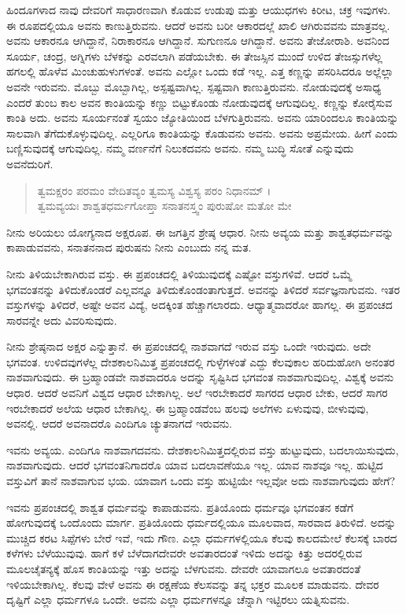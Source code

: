 ಹಿಂದೂಗಳಾದ ನಾವು ದೇವರಿಗೆ ಸಾಧಾರಣವಾಗಿ ಕೊಡುವ ಉಡುಪು ಮತ್ತು ಆಯುಧಗಳು ಕಿರೀಟ, ಚಕ್ರ ಇವುಗಳು. ಈ ರೂಪದಲ್ಲಿಯೂ ಅವನು ಕಾಣುತ್ತಿರುವನು. ಆದರೆ ಅವನು ಬರೀ ಆಕಾರದಲ್ಲೆ ಖಾಲಿ ಆಗಿರುವವನು ಮಾತ್ರವಲ್ಲ. ಅವನು ಆಕಾರನೂ ಆಗಿದ್ದಾನೆ, ನಿರಾಕಾರನೂ ಆಗಿದ್ದಾನೆ. ಸುಗುಣನೂ ಆಗಿದ್ದಾನೆ. ಅವನು ತೇಜೋರಾಶಿ. ಅವನಿಂದ ಸೂರ್ಯ, ಚಂದ್ರ, ಅಗ್ನಿಗಳು ಬೆಳಕನ್ನು ಎರವಲಾಗಿ ಪಡೆಯಬೇಕು. ಈ ತೇಜಸ್ಸಿನ ಮುಂದೆ ಉಳಿದ ತೇಜಸ್ಸುಗಳೆಲ್ಲ ಹಗಲಲ್ಲಿ ಹೊಳೆವ ಮಿಂಚುಹುಳುಗಳಂತೆ. ಅವನು ಎಲ್ಲೋ ಒಂದು ಕಡೆ ಇಲ್ಲ. ಎತ್ತ ಕಣ್ಣನ್ನು ಪಸರಿಸಿದರೂ ಅಲ್ಲೆಲ್ಲಾ ಅವನೇ ಇರುವನು. ಮೊಬ್ಬು ಮೊಬ್ಬಾಗಿಲ್ಲ, ಅಸ್ಪಷ್ಟವಾಗಿಲ್ಲ. ಸ್ಪಷ್ಟವಾಗಿ ಕಾಣುತ್ತಿರುವನು. ನೋಡುವುದಕ್ಕೆ ಅಸಾಧ್ಯ ಎಂದರೆ ತುಂಬ ಕಾಲ ಅವನ ಕಾಂತಿಯನ್ನು ಕಣ್ಣು ಬಿಟ್ಟುಕೊಂಡು ನೋಡುವುದಕ್ಕೆ ಆಗುವುದಿಲ್ಲ. ಕಣ್ಣನ್ನು ಕೋರೈಸುವ ಕಾಂತಿ ಅದು. ಅವನು ಸೂರ್ಯನಂತೆ ಸ್ವಯಂ ಜ್ಯೋತಿಯಿಂದ ಬೆಳಗುತ್ತಿರುವನು. ಅವನು ಯಾರಿಂದಲೂ ಕಾಂತಿಯನ್ನು ಸಾಲವಾಗಿ ತೆಗೆದುಕೊಳ್ಳುವುದಿಲ್ಲ. ಎಲ್ಲರಿಗೂ ಕಾಂತಿಯನ್ನು ಕೊಡುವನು ಅವನು. ಅವನು ಅಪ್ರಮೇಯ. ಹೀಗೆ ಎಂದು ಬಣ್ಣಿಸುವುದಕ್ಕೆ ಆಗುವುದಿಲ್ಲ. ನಮ್ಮ ವರ್ಣನೆಗೆ ನಿಲುಕದವನು ಅವನು. ನಮ್ಮ ಬುದ್ಧಿ ಸೋತೆ ಎನ್ನುವುದು ಅವನೆದುರಿಗೆ.

\begin{verse}
ತ್ವಮಕ್ಷರಂ ಪರಮಂ ವೇದಿತವ್ಯಂ ತ್ವಮಸ್ಯ ವಿಶ್ವಸ್ಯ ಪರಂ ನಿಧಾನಮ್ ।\\ತ್ವಮವ್ಯಯಃ ಶಾಶ್ವತಧರ್ಮಗೋಪ್ತಾ ಸನಾತನಸ್ತ್ವಂ ಪುರುಷೋ ಮತೋ ಮೇ 
\end{verse}

{\small ನೀನು ಅರಿಯಲು ಯೋಗ್ಯನಾದ ಅಕ್ಷರೂಪ. ಈ ಜಗತ್ತಿನ ಶ್ರೇಷ್ಠ ಆಧಾರ. ನೀನು ಅವ್ಯಯ ಮತ್ತು ಶಾಶ್ವತಧರ್ಮವನ್ನು ಕಾಪಾಡುವವನು, ಸನಾತನನಾದ ಪುರುಷನು ನೀನು ಎಂಬುದು ನನ್ನ ಮತ.}

ನೀನು ತಿಳಿಯಬೇಕಾಗಿರುವ ವಸ್ತು. ಈ ಪ್ರಪಂಚದಲ್ಲಿ ತಿಳಿಯುವುದಕ್ಕೆ ಎಷ್ಟೋ ವಸ್ತುಗಳಿವೆ. ಆದರೆ ಒಮ್ಮೆ ಭಗವಂತನನ್ನು ತಿಳಿದುಕೊಂಡರೆ ಎಲ್ಲವನ್ನೂ ತಿಳಿದುಕೊಂಡಂತಾಗುತ್ತದೆ. ಅವನನ್ನು ತಿಳಿದರೆ ಸರ್ವಜ್ಞನಾಗುವನು. ಇತರ ವಸ್ತುಗಳನ್ನು ತಿಳಿದರೆ, ಅಷ್ಟೇ ಅವನ ವಿದ್ಯೆ, ಅದಕ್ಕಿಂತ ಹೆಚ್ಚಾಗಲಾರದು. ಆಧ್ಯಾತ್ಮವಾದರೋ ಹಾಗಲ್ಲ. ಈ ಪ್ರಪಂಚದ ಸಾರವನ್ನೇ ಅದು ವಿವರಿಸುವುದು.

ನೀನು ಶ್ರೇಷ್ಠನಾದ ಅಕ್ಷರ ಎನ್ನುತ್ತಾನೆ. ಈ ಪ್ರಪಂಚದಲ್ಲಿ ನಾಶವಾಗದೆ ಇರುವ ವಸ್ತು ಒಂದೇ ಇರುವುದು. ಅದೇ ಭಗವಂತ. ಉಳಿದವುಗಳೆಲ್ಲ ದೇಶಕಾಲನಿಮಿತ್ತ ಪ್ರಪಂಚದಲ್ಲಿ ಗುಳ್ಳೆಗಳಂತೆ ಎದ್ದು ಕೆಲವುಕಾಲ ಹರಿದುಹೋಗಿ ಅನಂತರ ನಾಶವಾಗುವುದು. ಈ ಬ್ರಹ್ಮಾಂಡವೇ ನಾಶವಾದರೂ ಅದನ್ನು ಸೃಷ್ಟಿಸಿದ ಭಗವಂತ ನಾಶವಾಗುವುದಿಲ್ಲ. ವಿಶ್ವಕ್ಕೆ ಅವನು ಆಧಾರ. ಆದರೆ ಅವನಿಗೆ ವಿಶ್ವದ ಆಧಾರ ಬೇಕಾಗಿಲ್ಲ. ಅಲೆ ಇರಬೇಕಾದರೆ ಸಾಗರದ ಆಧಾರ ಬೇಕು, ಆದರೆ ಸಾಗರ ಇರಬೇಕಾದರೆ ಅಲೆಯ ಆಧಾರ ಬೇಕಾಗಿಲ್ಲ. ಈ ಬ್ರಹ್ಮಾಂಡವೆಂಬ ಹಲವು ಅಲೆಗಳು ಏಳುವುವು, ಬೀಳುವುವು, ಅವನಲ್ಲಿ. ಆದರೆ ಅವನಾದರೊ ಎಂದಿಗೂ ಚ್ಯುತನಾಗದೆ ಇರುವನು. 

ಇವನು ಅವ್ಯಯ. ಎಂದಿಗೂ ನಾಶವಾಗದವನು. ದೇಶಕಾಲನಿಮಿತ್ತದಲ್ಲಿರುವ ವಸ್ತು ಹುಟ್ಟುವುದು, ಬದಲಾಯಿಸುವುದು, ನಾಶವಾಗುವುದು. ಆದರೆ ಭಗವಂತನಿಗಾದರೊ ಯಾವ ಬದಲಾವಣೆಯೂ ಇಲ್ಲ. ಯಾವ ನಾಶವೂ ಇಲ್ಲ. ಹುಟ್ಟಿದ ವಸ್ತುವಿಗೆ ತಾನೆ ನಾಶವಾಗುವ ಭಯ. ಯಾವಾಗ ಒಂದು ವಸ್ತು ಹುಟ್ಟಿಯೇ ಇಲ್ಲವೋ ಅದು ನಾಶವಾಗುವುದು ಹೇಗೆ?

ಇವನು ಪ್ರಪಂಚದಲ್ಲಿ ಶಾಶ್ವತ ಧರ್ಮವನ್ನು ಕಾಪಾಡುವನು. ಪ್ರತಿಯೊಂದು ಧರ್ಮವೂ ಭಗವಂತನ ಕಡೆಗೆ ಹೋಗುವುದಕ್ಕೆ ಒಂದೊಂದು ಮಾರ್ಗ. ಪ್ರತಿಯೊಂದು ಧರ್ಮದಲ್ಲಿಯೂ ಮೂಲವಾದ, ಸಾರವಾದ ತಿರುಳಿದೆ. ಅದನ್ನು ಮುಚ್ಚಿದ ಕರಟ ಸಿಪ್ಪೆಗಳು ಬೇರೆ ಇವೆ, ಇದು ಗೌಣ. ಎಲ್ಲಾ ಧರ್ಮಗಳಲ್ಲಿಯೂ ಕೆಲವು ಕಾಲದಮೇಲೆ ಕೆಲಸಕ್ಕೆ ಬಾರದ ಕಳೆಗಳು ಬೆಳೆಯುವುವು. ಹಾಗೆ ಕಳೆ ಬೆಳೆದಾಗದೇವರೇ ಅವತಾರದಂತೆ ಇಳಿದು ಅದನ್ನು ಕಿತ್ತು ಅದರಲ್ಲಿರುವ ಮೂಲಚೈತನ್ಯಕ್ಕೆ ಹೊಸ ಕಾಂತಿಯನ್ನು ಇತ್ತು ಅದನ್ನು ಬೆಳಗುವನು. ದೇವರೇ ಯಾವಾಗಲೂ ಅವತಾರದಂತೆ ಇಳಿಯಬೇಕಾಗಿಲ್ಲ. ಕೆಲವು ವೇಳೆ ಅವನು ಈ ರಕ್ಷಣೆಯ ಕೆಲಸವನ್ನು ತನ್ನ ಭಕ್ತರ ಮೂಲಕ ಮಾಡುವನು. ದೇವರ ದೃಷ್ಟಿಗೆ ಎಲ್ಲಾ ಧರ್ಮಗಳೂ ಒಂದೇ. ಅವನು ಎಲ್ಲಾ ಧರ್ಮಗಳನ್ನೂ ಚೆನ್ನಾಗಿ ಇಟ್ಟಿರಲು ಯತ್ನಿಸುವನು.

